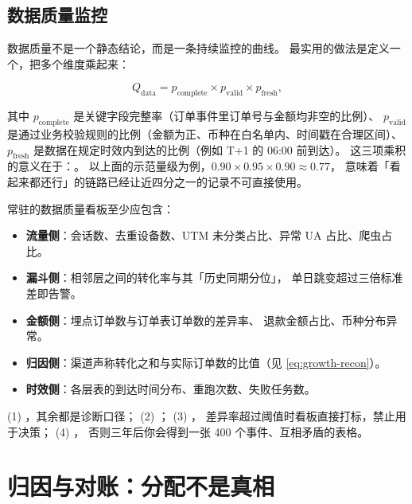 \subsection{数据质量监控}

数据质量不是一个静态结论，而是一条持续监控的曲线。
最实用的做法是定义一个，把多个维度乘起来：

\begin{equation}
Q_{\text{data}} = p_{\text{complete}} \times p_{\text{valid}} \times p_{\text{fresh}} ,
\label{eq:growth-dq}
\end{equation}

其中 $p_{\text{complete}}$ 是关键字段完整率（订单事件里订单号与金额均非空的比例）、
$p_{\text{valid}}$ 是通过业务校验规则的比例（金额为正、币种在白名单内、时间戳在合理区间）、
$p_{\text{fresh}}$ 是数据在规定时效内到达的比例（例如 T+1 的 06:00 前到达）。
这三项乘积的意义在于：。
以上面的示范量级为例，$0.90 \times 0.95 \times 0.90 \approx 0.77$，
意味着「看起来都还行」的链路已经让近四分之一的记录不可直接使用。

常驻的数据质量看板至少应包含：

\begin{itemize}
  \item \textbf{流量侧}：会话数、去重设备数、UTM 未分类占比、异常 UA 占比、爬虫占比。
  \item \textbf{漏斗侧}：相邻层之间的转化率与其「历史同期分位」，
        单日跳变超过三倍标准差即告警。
  \item \textbf{金额侧}：埋点订单数与订单表订单数的差异率、
        退款金额占比、币种分布异常。
  \item \textbf{归因侧}：渠道声称转化之和与实际订单数的比值（见 \cref{eq:growth-recon}）。
  \item \textbf{时效侧}：各层表的到达时间分布、重跑次数、失败任务数。
\end{itemize}

\begin{keypoint}[数据质量的四条硬纪律]
(1) ，其余都是诊断口径；
(2) ；
(3) ，
差异率超过阈值时看板直接打标，禁止用于决策；
(4) ，
否则三年后你会得到一张 400 个事件、互相矛盾的表格。
\end{keypoint}

\section{归因与对账：分配不是真相}

